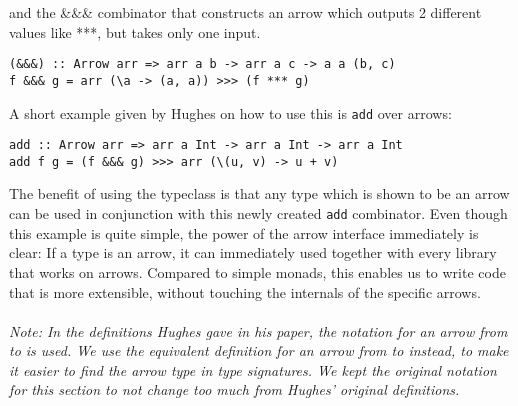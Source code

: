 and the \&\&\& combinator that constructs an arrow which outputs 2 different values like ***, but takes only one input.
\begin{lstlisting}[frame=htrbl]
(&&&) :: Arrow arr => arr a b -> arr a c -> a a (b, c)
f &&& g = arr (\a -> (a, a)) >>> (f *** g)
\end{lstlisting}
A short example given by Hughes on how to use this is \lstinline{add} over arrows:
\begin{lstlisting}[frame=htrbl]
add :: Arrow arr => arr a Int -> arr a Int -> arr a Int
add f g = (f &&& g) >>> arr (\(u, v) -> u + v)
\end{lstlisting}
The benefit of using the  typeclass is that any type which is shown to be an arrow can be used in conjunction with this newly created \lstinline{add} combinator. Even though this example is quite simple, the power of the arrow interface immediately is clear: If a type is an arrow, it can immediately used together with every library that works on arrows. Compared to simple monads, this enables us to write code that is more extensible, without touching the internals of the specific arrows.
\\\\
\textit{Note: In the definitions Hughes gave in his paper, the notation  for an arrow from  to  is used. We use the equivalent definition  for an arrow from  to  instead, to make it easier to find the arrow type in type signatures. We kept the original notation  for this section to not change too much from Hughes' original definitions.}